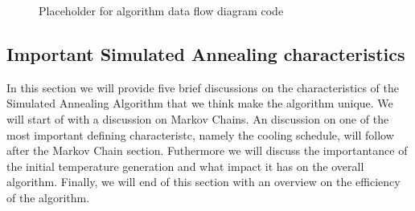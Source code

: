 \begin{figure}[htbp!]
	\centering
	\setlength \fboxsep{0pt}
	\setlength \fboxrule{0.5pt}
	\caption{Placeholder for algorithm data flow diagram code}
	\label{fig:SAFlowDiagram}
\end{figure}
\subsection{Important Simulated Annealing characteristics}
In this section we will provide five brief discussions on the characteristics of the Simulated Annealing Algorithm that we think make the algorithm unique. We will start of with a discussion on Markov Chains. An discussion on one of the most important defining characteristc, namely the cooling schedule, will follow after the Markov Chain section. Futhermore we will discuss the importantance of the initial temperature generation and what impact it has on the overall algorithm. Finally, we will end of this section with an overview on the efficiency of the algorithm.
